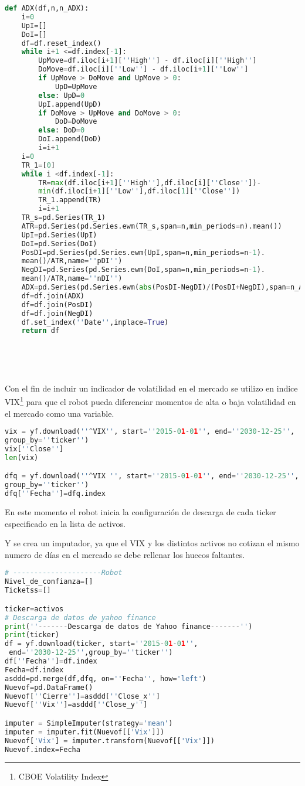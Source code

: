 \documentclass[letterpaper,12pt,oneside]{book}
\begin{document}
\begin{lstlisting}[language=Python]
def ADX(df,n,n_ADX):
    i=0
    UpI=[]
    DoI=[]
    df=df.reset_index()
    while i+1 <=df.index[-1]:
        UpMove=df.iloc[i+1][''High''] - df.iloc[i][''High'']
        DoMove=df.iloc[i][''Low''] - df.iloc[i+1][''Low'']
        if UpMove > DoMove and UpMove > 0:
            UpD=UpMove
        else: UpD=0
        UpI.append(UpD)
        if DoMove > UpMove and DoMove > 0:
            DoD=DoMove
        else: DoD=0
        DoI.append(DoD)
        i=i+1
    i=0
    TR_1=[0]
    while i <df.index[-1]:
        TR=max(df.iloc[i+1][''High''],df.iloc[i][''Close''])-
        min(df.iloc[i+1][''Low''],df.iloc[1][''Close''])
        TR_1.append(TR)
        i=i+1
    TR_s=pd.Series(TR_1)
    ATR=pd.Series(pd.Series.ewm(TR_s,span=n,min_periods=n).mean())
    UpI=pd.Series(UpI)
    DoI=pd.Series(DoI)
    PosDI=pd.Series(pd.Series.ewm(UpI,span=n,min_periods=n-1).
    mean()/ATR,name=''pDI'')
    NegDI=pd.Series(pd.Series.ewm(DoI,span=n,min_periods=n-1).
    mean()/ATR,name=''nDI'')
    ADX=pd.Series(pd.Series.ewm(abs(PosDI-NegDI)/(PosDI+NegDI),span=n_ADX,min_periods=n_ADX-1).mean(),name=''ADX'')
    df=df.join(ADX)
    df=df.join(PosDI)
    df=df.join(NegDI)
    df.set_index(''Date'',inplace=True)
    return df






\end{lstlisting}


Con el fin de incluir un indicador de volatilidad en el mercado se utilizo en indice VIX\footnote{CBOE Volatility Index} para que el robot pueda diferenciar momentos de alta o baja volatilidad en el mercado como una variable.

\begin{lstlisting}[language=Python]
vix = yf.download(''^VIX'', start=''2015-01-01'', end=''2030-12-25'',
group_by=''ticker'') 
vix[''Close'']
len(vix)

dfq = yf.download(''^VIX '', start=''2015-01-01'', end=''2030-12-25'',
group_by=''ticker'') 
dfq[''Fecha'']=dfq.index
\end{lstlisting}


En este momento el robot inicia la configuración de descarga de cada ticker especificado en la lista de activos.

Y se crea un imputador, ya que el VIX y los distintos activos no cotizan el mismo numero de días en el mercado se debe rellenar los huecos faltantes.
\begin{lstlisting}[language=Python]
# ---------------------Robot
Nivel_de_confianza=[]
Ticketss=[]

ticker=activos
# Descarga de datos de yahoo finance 
print(''-------Descarga de datos de Yahoo finance-------'')
print(ticker)
df = yf.download(ticker, start=''2015-01-01'',
 end=''2030-12-25'',group_by=''ticker'') 
df[''Fecha'']=df.index
Fecha=df.index
asddd=pd.merge(df,dfq, on=''Fecha'', how='left')
Nuevof=pd.DataFrame()
Nuevof[''Cierre'']=asddd[''Close_x'']
Nuevof[''Vix'']=asddd[''Close_y'']

imputer = SimpleImputer(strategy='mean')
imputer = imputer.fit(Nuevof[['Vix']])
Nuevof['Vix'] = imputer.transform(Nuevof[['Vix']])
Nuevof.index=Fecha
\end{lstlisting}
\end{document}
